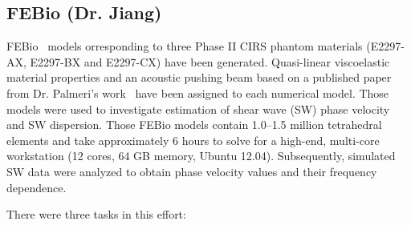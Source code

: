 \subsection{FEBio (Dr. Jiang)}
FEBio~\cite{Mass2012} models orresponding to three Phase II CIRS phantom
materials (E2297-AX, E2297-BX and E2297-CX) have been generated. Quasi-linear
viscoelastic material properties and an acoustic pushing beam based on a
published paper from Dr.  Palmeri’s work~\cite{Palmeri2008} have been assigned
to each numerical model.  Those models were used to investigate estimation of
shear wave (SW) phase velocity and SW dispersion. Those FEBio models contain
1.0--1.5 million tetrahedral elements and take approximately 6 hours to solve
for a high-end, multi-core workstation (12 cores, 64 GB memory, Ubuntu 12.04).
Subsequently, simulated SW data were analyzed to obtain phase velocity values
and their frequency dependence.

There were three tasks in this effort:

